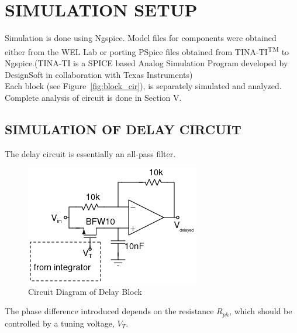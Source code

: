 \documentclass[]{risa}
\begin{document}
\section{SIMULATION SETUP}
Simulation is done using Ngspice. Model files for components were obtained either from the WEL Lab or porting PSpice files obtained from TINA-TI\textsuperscript{TM} to Ngspice.(\small{TINA-TI is a SPICE based Analog Simulation Program developed by DesignSoft in collaboration with Texas Instruments})\normalsize  \\
Each block (see Figure~\ref{fig:block_cir}), is separately simulated and analyzed. Complete analysis of circuit is done in Section V.

\subsection{SIMULATION OF DELAY CIRCUIT}
The delay circuit is essentially an all-pass filter.
\begin{figure}[H]
    \centering
    \includegraphics[width=\columnwidth]{delay_cir.png}
    \caption{Circuit Diagram of Delay Block}
    \label{fig:delay_circuitdiag}
\end{figure}
The phase difference introduced depends on the resistance $R_{ph}$, which should be controlled by a tuning voltage, $V_T$.
\end{document}
